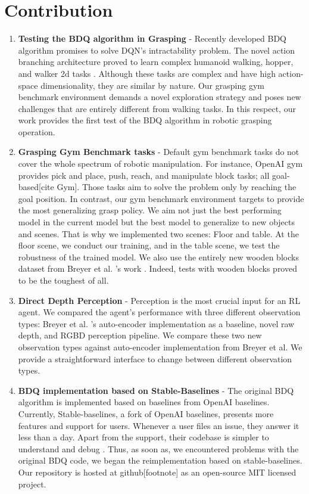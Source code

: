 \section{Contribution}

\begin{enumerate}
    \item \textbf{Testing the BDQ algorithm in Grasping} - Recently developed BDQ algorithm promises to solve DQN's intractability problem. The novel action branching architecture proved to learn complex humanoid walking, hopper, and walker 2d tasks \cite{Tavakoli2018}. Although these tasks are complex and have high action-space dimensionality, they are similar by nature. Our grasping gym benchmark environment demands a novel exploration strategy and poses new challenges that are entirely different from walking tasks. In this respect, our work provides the first test of the BDQ algorithm in robotic grasping operation.

    \item \textbf{Grasping Gym Benchmark tasks} - Default gym benchmark tasks do not cover the whole spectrum of robotic manipulation. For instance, OpenAI gym provides pick and place, push, reach, and manipulate block tasks; all goal-based[cite Gym]. Those tasks aim to solve the problem only by reaching the goal position. In contrast, our gym benchmark environment targets to provide the most generalizing grasp policy. We aim not just the best performing model in the current model but the best model to generalize to new objects and scenes. That is why we implemented two scenes: Floor and table. At the floor scene, we conduct our training, and in the table scene, we test the robustness of the trained model. We also use the entirely new wooden blocks dataset from Breyer et al. 's work \cite{Breyer2018}. Indeed, tests with wooden blocks proved to be the toughest of all. 

    \item \textbf{Direct Depth Perception} - Perception is the most crucial input for an RL agent. We compared the agent's performance with three different observation types: Breyer et al. 's auto-encoder implementation as a baseline, novel raw depth, and RGBD perception pipeline. We compare these two new observation types against auto-encoder implementation from Breyer et al. We provide a straightforward interface to change between different observation types.

    \item \textbf{BDQ implementation based on Stable-Baselines} - The original BDQ algorithm is implemented based on baselines from OpenAI baselines. Currently, Stable-baselines, a fork of OpenAI baselines, presents more features and support for users. Whenever a user files an issue, they answer it less than a day. Apart from the support, their codebase is simpler to understand and debug \cite{stable-baselines}. Thus, as soon as, we encountered problems with the original BDQ code, we began the reimplementation based on stable-baselines. Our repository is hosted at github[footnote] as an open-source MIT licensed project.


\end{enumerate}
